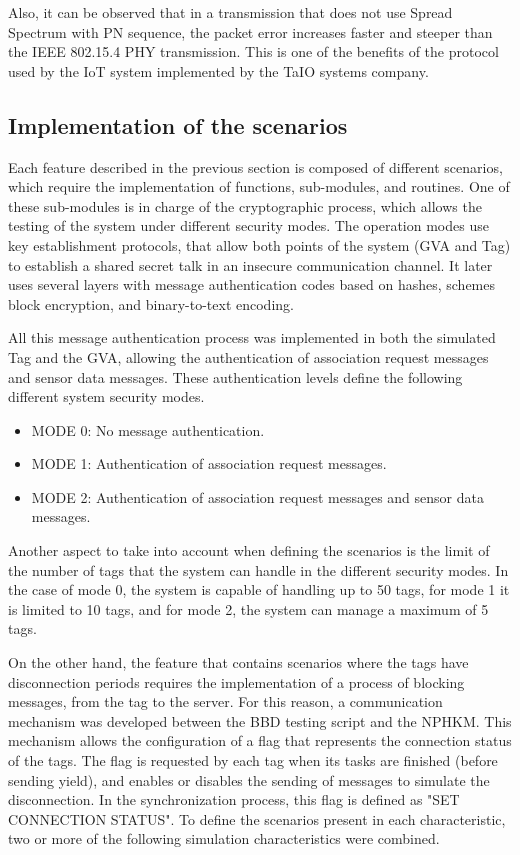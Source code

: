 \documentclass[journal]{IEEEtran}	%
\begin{document}
Also, it can be observed that in a transmission that does not use Spread Spectrum with PN sequence, the packet error increases faster and steeper than the IEEE 802.15.4 PHY transmission. This is one of the benefits of the protocol used by the IoT system implemented by the TaIO systems company.


\subsection{Implementation of the scenarios}
\label{sec:implScenarios}


Each feature described in the previous section is composed of different scenarios, which require the implementation of functions, sub-modules, and routines. One of these sub-modules is in charge of the cryptographic process, which allows the testing of the system under different security modes. The operation modes use key establishment protocols, that allow both  points of the system (GVA and Tag) to establish a shared secret talk in an insecure communication channel. It later uses several layers with message authentication codes based on hashes, schemes block encryption, and binary-to-text encoding.

All this message authentication process was implemented in both the simulated Tag and the GVA, allowing the authentication of  association request messages and sensor data messages. These authentication levels define the following different system security modes.

\begin{itemize}
    \item MODE 0: No message authentication.
    \item MODE 1: Authentication of association request messages.
    \item MODE 2: Authentication of association request messages and sensor data messages.
\end{itemize}

Another aspect to take into account when defining the scenarios is the limit of the number of tags that the system can handle in the different security modes. In the case of mode 0, the system is capable of handling up to 50 tags, for mode 1 it is  limited to 10 tags, and for mode 2, the system can manage a maximum of 5 tags.

On the other hand, the feature that contains scenarios where the tags have disconnection periods requires the implementation of a process of blocking messages, from the tag to the server. For this reason, a communication mechanism was developed between the BBD testing script and the NPHKM. This mechanism allows the configuration of a flag that represents the connection status of the tags. The flag is requested by each tag when its tasks are finished (before sending yield), and enables or disables the sending of messages to simulate the disconnection. In the synchronization process, this flag is defined as "SET CONNECTION STATUS". To define the scenarios present in each characteristic, two or more of the following simulation characteristics were combined.
\end{document}
